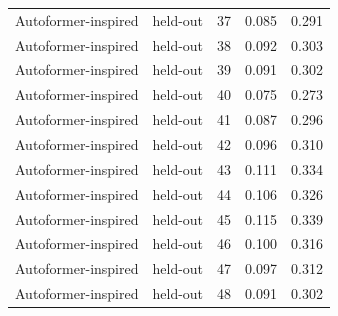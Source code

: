 \begin{tabular}{llrrr}
Autoformer-inspired & held-out & 37 & 0.085 & 0.291 \\
Autoformer-inspired & held-out & 38 & 0.092 & 0.303 \\
Autoformer-inspired & held-out & 39 & 0.091 & 0.302 \\
Autoformer-inspired & held-out & 40 & 0.075 & 0.273 \\
Autoformer-inspired & held-out & 41 & 0.087 & 0.296 \\
Autoformer-inspired & held-out & 42 & 0.096 & 0.310 \\
Autoformer-inspired & held-out & 43 & 0.111 & 0.334 \\
Autoformer-inspired & held-out & 44 & 0.106 & 0.326 \\
Autoformer-inspired & held-out & 45 & 0.115 & 0.339 \\
Autoformer-inspired & held-out & 46 & 0.100 & 0.316 \\
Autoformer-inspired & held-out & 47 & 0.097 & 0.312 \\
Autoformer-inspired & held-out & 48 & 0.091 & 0.302 \\
\bottomrule
\end{tabular}
